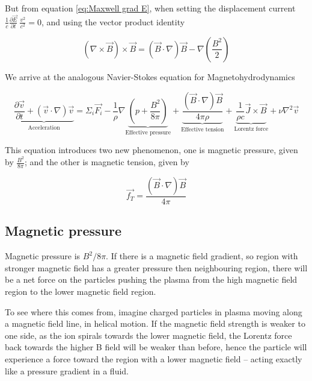 But from equation \ref{eq:Maxwell grad E}, when setting the displacement current 
$\frac{1}{c} \frac{\partial \Vec{E}}{\partial t} ~ \frac{v^2}{c^2} = 0$, and using the vector product identity

\begin{equation}\label{Vector identity curl B curl B}
    (\nabla \times \Vec{B}) \times \Vec{B} = (\Vec{B} \cdot \nabla) \Vec{B} - \nabla (\frac{B^2}{2})
\end{equation}

We arrive at the analogous Navier-Stokes equation for Magnetohydrodynamics

\begin{equation}\label{eq:Navier-stokes for MHD}
    \underbrace{\frac{\partial \Vec{v}}{\partial t} + (\Vec{v}\cdot\nabla)\Vec{v}}_{\text{Acceleration}} = 
    \Sigma_{i}\Vec{F_i} - 
    \frac{1}{\rho} \nabla \underbrace{ \left( p + \frac{B^2}{8 \pi} \right)}_{\text{Effective pressure}} + 
    \underbrace{\frac{(\Vec{B}\cdot \nabla) \Vec{B}}{4 \pi \rho}}_{\text{Effective tension}} + 
    \underbrace{\frac{1}{\rho c} \Vec{J} \times \Vec{B}}_{\text{Lorentz force}} +
    \nu \nabla^2 \Vec{v}
\end{equation}

This equation introduces two new phenomenon, one is magnetic pressure, given by $\frac{B^2}{8 \pi}$; and the other is magnetic tension, given by 

\begin{equation}\label{eq:Magnetic tension}
    \Vec{f_T} = \frac{(\Vec{B}\cdot \nabla) \Vec{B}}{4 \pi}
\end{equation}

\subsection{Magnetic pressure}

Magnetic pressure is $B^2/8\pi$. If there is a magnetic field gradient, so region with stronger magnetic field has a greater pressure then neighbouring region, there will be a net force on the particles pushing the plasma from the high magnetic field region to the lower magnetic field region.

To see where this comes from, imagine charged particles in plasma moving along a magnetic field line, in helical motion. If the magnetic field strength is weaker to one side, as the ion spirals towards the lower magnetic field, the Lorentz force back towards the higher B field will be weaker than before, hence the particle will experience a force toward the region with a lower magnetic field – acting exactly like a pressure gradient in a fluid.


